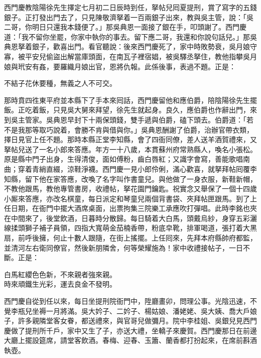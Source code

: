 西門慶教陰陽徐先生擇定七月初二日辰時到任，拏帖兒囘夏提刑，賞了寫字的五錢銀子。正打發出門去了，只見陳敬濟拏着一百兩銀子出來，教與吳主管，說：「吳二哥，你明日只還我本錢便了。」那吳典恩一面接了銀在手，叩頭謝了。西門慶道：「我不留你坐罷，你家中執你的事去。留下應二哥，我還和你說句話兒。」那吳典恩拏着銀子，歡喜出門。看官聽說：後來西門慶死了，家中時敗勢衰，吳月娘守寡，被平安兒偷盜出解當庫頭面，在南瓦子裡宿娼，被吳驛丞拏住，教他指攀吳月娘與玳安有姦，要羅織月娘出官，恩將仇報。此係後事，表過不題。正是：

\begin{myquote}
不結子花休要種，無義之人不可交。
\end{myquote}

那時賁四徃東平府並本縣下了手本來囘話，西門慶留他和應伯爵，陪陰陽徐先生擺飯。正吃着飯，只見吳大舅來拜望，徐先生就起身。良久，應伯爵也作辭出門，來到吳主管家。吳典恩早封下十兩保頭錢，雙手遞與伯爵，磕下頭去。伯爵道：「若不是我那等取巧說着，會勝不肯與借與你。」{}吳典恩酬謝了伯爵，治辦官帶衣類，擇日見官上任不題。那時本縣正堂李知縣，會了四衙同僚，差人送羊酒賀禮來，又拏帖兒送了一名小郎來答應。年方一十八歲，本貫蘇州府常熟縣人，喚名小張松。原是縣中門子出身，生得清俊，面如傅粉，齒白唇紅；又識字會寫，善能歌唱南曲；穿着青綃直綴，涼鞋淨襪。西門慶一見小郎伶俐，滿心歡喜，就拏拜帖囘覆李知縣，留下他在家答應，改喚了名字叫作書童兒。與他做了一身衣服，新鞋新帽，不教他跟馬，教他專管書房，收禮帖，拏花園門鑰匙。祝實念又舉保了一個十四歲小厮來答應，亦改名棋童，每日派定和琴童兒兩個背書袋、夾拜帖匣跟馬。到了上任日期，在衙門中擺大酒席桌面，出票拘集三院樂工承應吹打彈唱。此時李銘也夾在中間來了，後堂飲酒，日暮時分散歸。每日騎着大白馬，頭戴烏紗，身穿五彩灑線揉頭獅子補子員領，四指大寬萌金茄楠香帶，粉底皁靴，排軍喝道，張打着大黑扇，前呼後擁，何止十數人跟隨，在街上搖擺。{}上任囘來，先拜本府縣帥府都監，並清河左右衛同僚官，然後新朋隣舍，何等榮耀施為！家中收禮接帖子，一日不斷。正是：

\begin{myquote}
白馬紅纓色色新，不來親者強來親。\\時來頑鐵生光彩，運去良金不發明。
\end{myquote}

西門慶自從到任以來，每日坐提刑院衙門中，陞廳畫卯，問理公事。光陰迅速，不覺李瓶兒坐褥一月將滿。吳大妗子、二妗子、楊姑娘、潘姥姥、吳大姨、喬大戶娘子，許多親隣堂客女眷，都送禮來，與官哥兒做彌月。院中李桂姐、吳銀兒見西門慶做了提刑所千戶，家中又生了子，亦送大禮，坐轎子來慶賀。西門慶那日在前邊大廳上擺設筵席，請堂客飲酒。春梅、迎春、玉簫、蘭香都打扮起來，在席前斟酒執壺。

